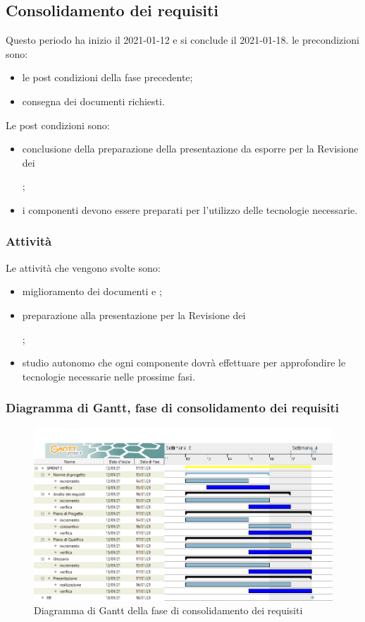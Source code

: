 \subsection{Consolidamento dei requisiti}
Questo periodo ha inizio il 2021-01-12 e si conclude il 2021-01-18.
le precondizioni sono:
\begin{itemize}
	\item le post condizioni della fase precedente;
	\item consegna dei documenti richiesti.
\end{itemize}
Le post condizioni sono:
\begin{itemize}
	\item conclusione della preparazione della presentazione da esporre per la Revisione dei ;
	\item i componenti devono essere preparati per l'utilizzo delle tecnologie necessarie.
\end{itemize}
\subsubsection{Attività}
Le attività che vengono svolte sono:
\begin{itemize}
	\item miglioramento dei documenti e ;
	\item preparazione alla presentazione per la Revisione dei ;
	\item studio autonomo che ogni componente dovrà effettuare per approfondire le tecnologie necessarie nelle prossime fasi.
\end{itemize}
\subsubsection{Diagramma di Gantt, fase di consolidamento dei requisiti}
\begin{figure}[H]
    \centering
    \includegraphics[scale = 0.4]{components/img/consolidamento_requisiti.png}
    \caption{Diagramma di Gantt della fase di consolidamento dei requisiti}
    \label{fig:Diagramma di Gantt, fase di consolidamento dei requisiti}
\end{figure}

